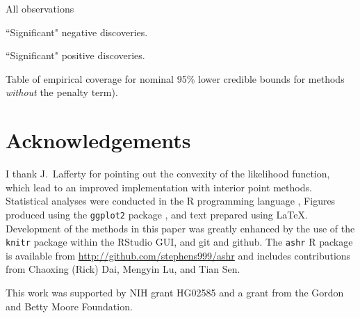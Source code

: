 \documentclass[11pt]{article}
\begin{document}
\begin{table}[!ht]
\begin{subtable}{\textwidth}
	\centering
	\caption{All observations}
\end{subtable}

\begin{subtable}{\textwidth}
\centering
\caption{``Significant" negative discoveries.}
\end{subtable}

\begin{subtable}{\textwidth}
\centering
\caption{``Significant" positive discoveries.}
\end{subtable}

\caption{Table of empirical coverage for nominal 95\% lower credible bounds for methods {\it without} the penalty term). } \label{tab:nopen}
\end{table}


\section*{Acknowledgements}

I thank J.~Lafferty for pointing out the convexity of the likelihood function, which lead to an improved implementation with interior point methods. 
Statistical analyses were conducted in the {\sf R} programming language \cite{Rcore:2012}, Figures produced using the {\tt ggplot2} package \cite{ggplot2}, and text
prepared using \LaTeX. Development of the methods in this paper was greatly enhanced by the use of the {\tt knitr} package \cite{xie2013dynamic}  within the RStudio GUI, and 
git and github. The {\tt ashr} R package is available from \href{http://github.com/stephens999/ashr}{http://github.com/stephens999/ashr} and includes contributions 
from Chaoxing (Rick) Dai, Mengyin Lu, and Tian Sen. 

This work was supported by NIH grant HG02585 and a grant from the Gordon and Betty Moore Foundation.
\end{document}
